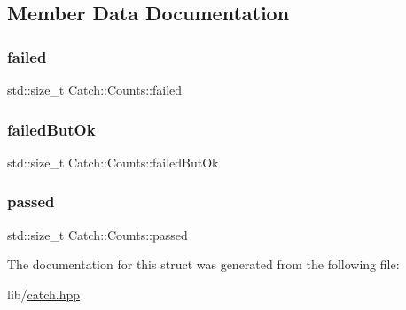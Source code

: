 \subsection{Member Data Documentation}
\hypertarget{struct_catch_1_1_counts_a19982a3817a3bc2c07f0290e71f497a3}{}\label{struct_catch_1_1_counts_a19982a3817a3bc2c07f0290e71f497a3} 
\subsubsection{\texorpdfstring{failed}{failed}}
{\footnotesize\ttfamily std\+::size\+\_\+t Catch\+::\+Counts\+::failed}

\hypertarget{struct_catch_1_1_counts_ac090973a2ff51394cd452718e75c073e}{}\label{struct_catch_1_1_counts_ac090973a2ff51394cd452718e75c073e} 
\subsubsection{\texorpdfstring{failed\+But\+Ok}{failedButOk}}
{\footnotesize\ttfamily std\+::size\+\_\+t Catch\+::\+Counts\+::failed\+But\+Ok}

\hypertarget{struct_catch_1_1_counts_ad28daaf3de28006400208b6dd0c631e6}{}\label{struct_catch_1_1_counts_ad28daaf3de28006400208b6dd0c631e6} 
\subsubsection{\texorpdfstring{passed}{passed}}
{\footnotesize\ttfamily std\+::size\+\_\+t Catch\+::\+Counts\+::passed}



The documentation for this struct was generated from the following file\+:\begin{DoxyCompactItemize}
\item 
lib/\hyperlink{catch_8hpp}{catch.\+hpp}\end{DoxyCompactItemize}
